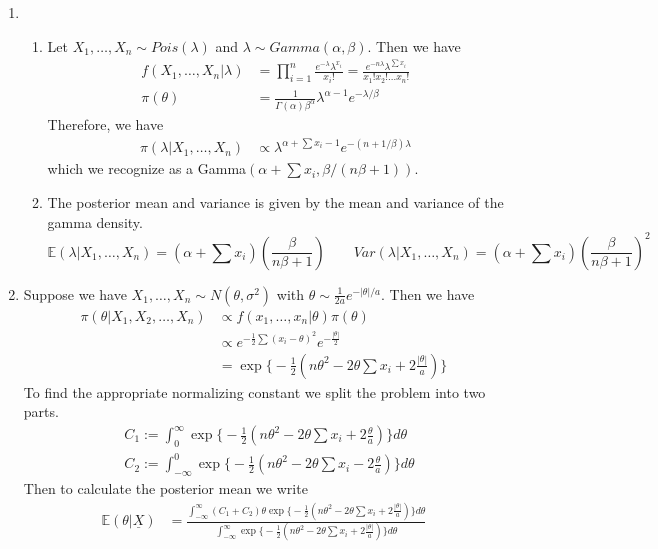 \documentclass[12pt]{article}  %
\newcommand{\E}{{\mathbb{E}}}
\begin{document}
\begin{enumerate}
\begin{enumerate}
	\end{enumerate}	

\item 

	\begin{enumerate}
		\item Let $X_1, \ldots, X_n \sim Pois(\lambda)$ and $\lambda \sim Gamma(\alpha,\beta)$. Then we have
		\begin{align*}
		f(X_1, \ldots, X_n|\lambda) &= \prod_{i=1}^{n}\frac{e^{-\lambda}\lambda^{x_i}}{x_i!} = \frac{e^{-n\lambda}\lambda^{\sum x_i}}{x_1!x_2!\ldots x_n!}\\
		\pi(\theta) &= \frac{1}{\Gamma(\alpha)\beta^\alpha}\lambda^{\alpha -1}e^{-\lambda/\beta}
		\end{align*}
		Therefore, we have 
		\begin{align*}
		\pi(\lambda|X_1, \ldots, X_n) &\propto \lambda^{\alpha + \sum x_i - 1}e^{-(n + 1/\beta)\lambda} 
		\end{align*}
		which we recognize as a Gamma$(\alpha + \sum x_i, \beta/(n\beta + 1))$. 
	
		\item The posterior mean and variance is given by the mean and variance of the gamma density. $$\E(\lambda|X_1, \ldots, X_n) = (\alpha + \sum x_i)(\frac{\beta}{n\beta +1})\hspace{2em}Var(\lambda|X_1, \ldots, X_n)=(\alpha + \sum x_i)\left(\frac{\beta}{n\beta +1}\right)^2$$

	\end{enumerate}

\item Suppose we have $X_1, \ldots, X_n\sim N(\theta, \sigma^2)$ with $\theta\sim \frac{1}{2a}e^{-|\theta|/a}$. Then we have 
\begin{align*}
\pi(\theta|X_1, X_2, \ldots, X_n) &\propto f(x_1, \ldots, x_n|\theta)\pi(\theta)\\
&\propto e^{-\frac{1}{2}\sum(x_i -\theta)^2}e^{-\frac{|\theta|}{2}}\\
&= \exp\Big\{-\frac{1}{2}\left(n\theta^2 - 2\theta\sum x_i + 2\frac{|\theta|}{a}\right)\Big\}
\end{align*}
To find the appropriate normalizing constant we split the problem into two parts.
\begin{align*}
&C_1 := \int_{0}^{\infty}\exp\Big\{-\frac{1}{2}\left(n\theta^2 - 2\theta\sum x_i + 2\frac{\theta}{a}\right)\Big\}d\theta\\
&C_2 := \int_{-\infty}^{0}\exp\Big\{-\frac{1}{2}\left(n\theta^2 - 2\theta\sum x_i - 2\frac{\theta}{a}\right)\Big\}d\theta
\end{align*}
Then to calculate the posterior mean we write
\begin{align*}
\E(\theta|\underline{X}) &= \frac{\int_{-\infty}^{\infty}(C_1+C_2)\theta\exp\Big\{-\frac{1}{2}\left(n\theta^2 - 2\theta\sum x_i + 2\frac{|\theta|}{a}\right)\Big\}d\theta}{\int_{-\infty}^{\infty}\exp\Big\{-\frac{1}{2}\left(n\theta^2 - 2\theta\sum x_i + 2\frac{|\theta|}{a}\right)\Big\}d\theta}\\
\end{align*}


\end{enumerate}
\end{document}
